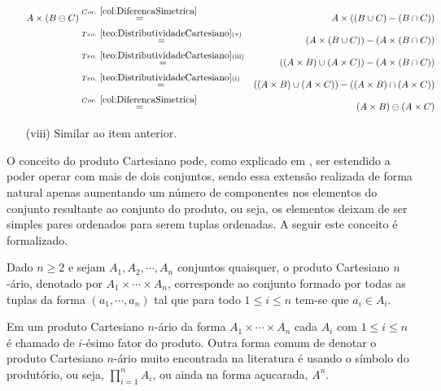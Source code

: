 \begin{prova}
\begin{itemize}
		\begin{eqnarray*}
			A \times (B \ominus C) & \stackrel{Cor. \ \ref{col:DiferencaSimetrica}}{=} & A \times ((B \cup C) - (B \cap C))\\
			& \stackrel{Teo. \ \ref{teo:DistributividadeCartesiano}(\text{v})}{=} & (A \times (B \cup C)) - (A \times (B \cap C))\\
			& \stackrel{Teo. \ \ref{teo:DistributividadeCartesiano}(\text{iii})}{=} & ((A \times B) \cup (A \times C)) - (A \times (B \cap C))\\
			& \stackrel{Teo. \ \ref{teo:DistributividadeCartesiano}(\text{i})}{=} & ((A \times B) \cup (A \times C)) - ((A \times B) \cap (A \times C))\\
			& \stackrel{Cor. \ \ref{col:DiferencaSimetrica}}{=} & (A \times B) \ominus (A \times C)
		\end{eqnarray*}
		\item[(viii)] Similar ao item anterior.
	\end{itemize}
\end{prova}


O conceito do produto Cartesiano pode, como explicado em \cite{lipschutz1978-TC, lipschutz2013-MD}, ser estendido a poder operar com mais de dois conjuntos, sendo essa extensão realizada de forma natural apenas aumentando um número de componentes nos elementos do conjunto resultante ao conjunto do produto, ou seja, os elementos deixam de ser simples pares ordenados para serem tuplas ordenadas. A seguir este conceito é formalizado.

\begin{definicao}\label{def:Cartesianonario}
	Dado $n \geq 2$ e sejam $A_1, A_2, \cdots, A_n$ conjuntos quaisquer, o produto Cartesiano $n$-ário, denotado por $A_1 \times \cdots \times A_n$, corresponde ao conjunto formado por todas as tuplas da forma $(a_1, \cdots, a_n)$ tal que para todo $1 \leq i \leq n$ tem-se que $a_i \in A_i$.
\end{definicao}

Em um produto Cartesiano $n$-ário da forma $A_1 \times \cdots \times A_n$ cada $A_i$ com $1 \leq i \leq n$ é chamado de $i$-ésimo fator do produto. Outra forma comum de denotar o produto Cartesiano $n$-ário muito encontrada na literatura é usando o símbolo do produtório, ou seja, $\displaystyle\prod_{i = 1}^{n} A_i$, ou ainda na forma açucarada, $A^n$.

